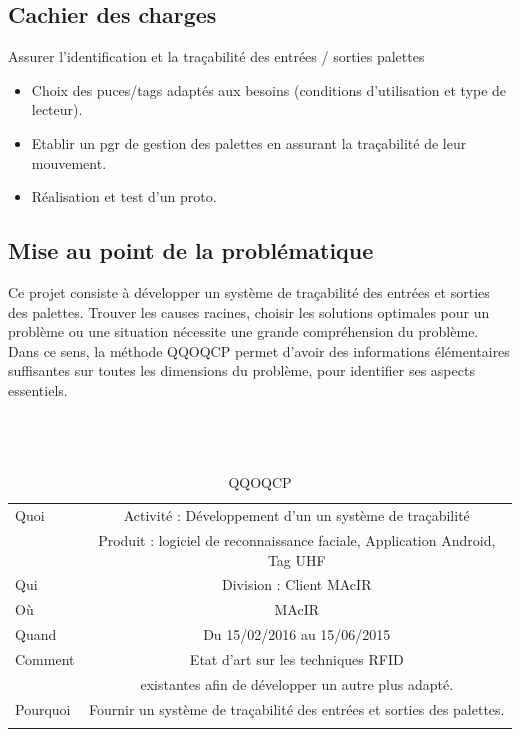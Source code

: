 \documentclass[11pt, a4paper, twoside]{book}
\begin{document}
\subsection{Cachier des charges}
Assurer l’identification et la traçabilité des entrées / sorties palettes
\begin{itemize}
\item Choix des puces/tags adaptés aux besoins (conditions d’utilisation et type de lecteur).
\item Etablir un pgr de gestion des palettes en assurant la traçabilité de leur mouvement.
\item Réalisation et test d’un proto.\\
\end{itemize}
\subsection{Mise au point de la problématique}
Ce projet consiste à développer un système de traçabilité des entrées et sorties des palettes. Trouver les causes racines, choisir les solutions optimales pour un problème ou une situation nécessite une grande compréhension du problème. Dans ce sens, la méthode QQOQCP permet d'avoir des informations élémentaires suffisantes sur toutes les dimensions du problème, pour identifier ses aspects essentiels.\\\\\\\
        
\begin{longtable}{|l|c|}
  \hline
  Quoi & Activité : Développement d’un un système de traçabilité \\
       &  Produit : logiciel de reconnaissance faciale, Application Android, Tag UHF \\
  \hline
  Qui & Division : Client MAcIR\\
  \hline
  Où & MAcIR\\
  \hline
  Quand & Du 15/02/2016 au 15/06/2015\\
  \hline
  Comment & Etat d’art sur les techniques RFID \\
          &  existantes afin de développer un autre plus adapté.\\
  \hline
  Pourquoi & Fournir un système de traçabilité des entrées et sorties des palettes.\\
  \hline
  
\caption{QQOQCP}
\end{longtable}
\end{document}
